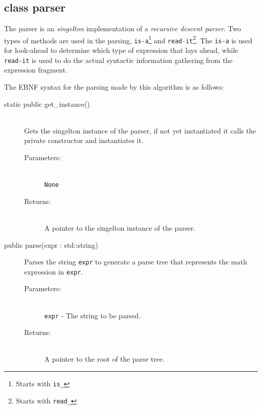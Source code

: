 \documentclass[a4paper,11pt]{kth-mag}
\begin{document}
\subsection{class parser}
The parser is an \emph{singelton} implementation of a \emph{recursive descent parser}. Two
types of methods are used in the parsing, \texttt{is-a}\footnote{Starts with
\texttt{is\_}} and \texttt{read-it}\footnote{Starts with \texttt{read\_}}.
The \texttt{is-a} is used for look-ahead to determine which type of expression
that lays ahead, while \texttt{read-it} is used to do the actual syntactic 
information gathering from the expression fragment.

The EBNF syntax for the parsing made by this algorithm is as follows:\\


\begin{description}
    \item[static public get\_instance()]~\\
    Gets the singelton instance of the parser, if not yet instantiated it calls
    the private constructor and instantiates it.
    \begin{description}
        \item[Parameters:]~\\
            \verb+None+
        \item[Returns:]~\\
            A pointer to the singelton instance of the parser.
    \end{description}

\end{description}

\begin{description}
    \item[public parse(expr : std::string)] Parses the string \texttt{expr} to
    generate a parse tree that represents the math expression in \texttt{expr}.
    \begin{description}
        \item[Parameters:]~\\
            \verb+expr+ - The string to be parsed.
        \item[Returns:]~\\
            A pointer to the root of the parse tree.
    \end{description}
\end{description}
\end{document}
